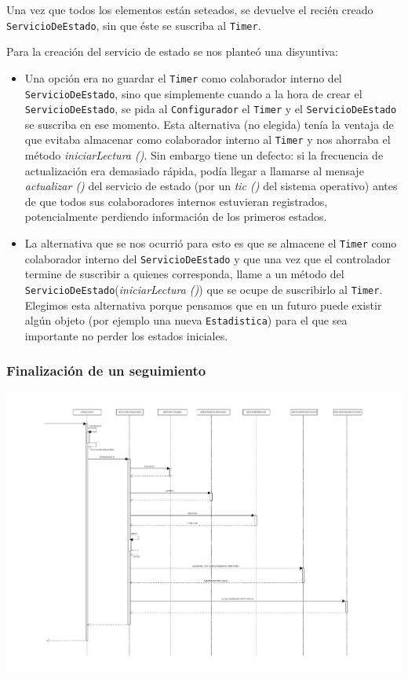  Una vez que todos los elementos están seteados, se devuelve el recién creado \texttt{ServicioDeEstado}, sin que éste se suscriba al \texttt{Timer}.  


Para la creación del servicio de estado se nos planteó una disyuntiva:
\begin{itemize}
	\item Una opción era no guardar el \texttt{Timer} como colaborador interno del \texttt{ServicioDeEstado}, sino que simplemente cuando a la hora de crear el \texttt{ServicioDeEstado}, se pida al \texttt{Configurador} el \texttt{Timer} y el \texttt{ServicioDeEstado} se suscriba en ese momento. Esta alternativa (no elegida) tenía la ventaja de que evitaba almacenar como colaborador interno al \texttt{Timer} y nos ahorraba el método \emph{iniciarLectura ()}. Sin embargo tiene un defecto: si la frecuencia de actualización era demasiado rápida, podía llegar a llamarse al mensaje \emph{actualizar ()} del servicio de estado (por un \emph{tic ()} del sistema operativo) antes de que todos sus colaboradores internos estuvieran registrados, potencialmente perdiendo información de los primeros estados.
	\item La alternativa que se nos ocurrió para esto es que se almacene el \texttt{Timer} como colaborador interno del \texttt{ServicioDeEstado} y que una vez que el controlador termine de suscribir a quienes corresponda, llame a un método del \texttt{ServicioDeEstado}(\emph{iniciarLectura ()}) que se ocupe de suscribirlo al \texttt{Timer}. Elegimos esta alternativa porque pensamos que en un futuro puede existir algún objeto (por ejemplo una nueva \texttt{Estadistica}) para el que sea importante no perder los estados iniciales. 
\end{itemize}


\subsubsection{Finalización de un seguimiento}
\begin{center}
	\includegraphics[scale=0.5]{images/FinalizacionSeguimiento.pdf}
\end{center}

